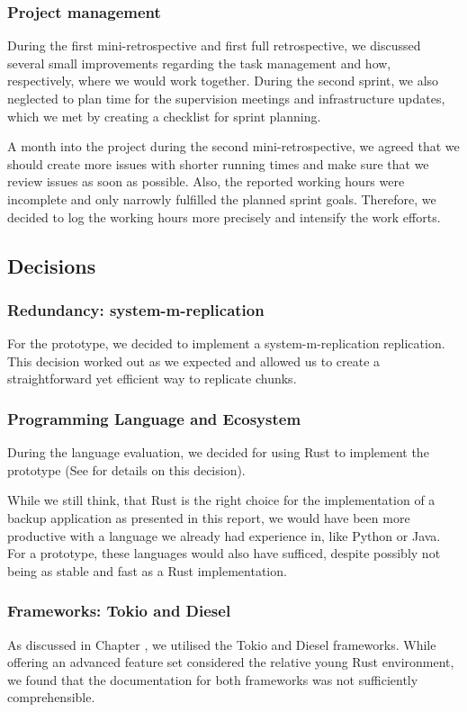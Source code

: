 \subsubsection{Project management}
During the first mini-retrospective and first full retrospective, we discussed several small improvements regarding the task management and how, respectively, where we would work together. During the second sprint, we also neglected to plan time for the supervision meetings and infrastructure updates, which we met by creating a checklist for sprint planning.

A month into the project during the second mini-retrospective, we agreed that we should create more issues with shorter running times and make sure that we review issues as soon as possible. Also, the reported working hours were incomplete and only narrowly fulfilled the planned sprint goals. Therefore, we decided to log the working hours more precisely and intensify the work efforts.


\subsection{Decisions}
\subsubsection{Redundancy: \gls{system-m-replication}}
For the prototype, we decided to implement a \gls{system-m-replication} replication. This decision worked out as we expected and allowed us to create a straightforward yet efficient way to replicate \glspl{chunk}.

\subsubsection{Programming Language and Ecosystem}
During the language evaluation, we decided for using Rust to implement the prototype (See  for details on this decision).

While we still think, that Rust is the right choice for the implementation of a backup application as presented in this report, we would have been more productive with a language we already had experience in, like Python or Java. For a prototype, these languages would also have sufficed, despite possibly not being as stable and fast as a Rust implementation.

\subsubsection{Frameworks: Tokio and Diesel}
As discussed in Chapter , we utilised the Tokio and Diesel frameworks. While offering an advanced feature set considered the relative young Rust environment, we found that the documentation for both frameworks was not sufficiently comprehensible.


